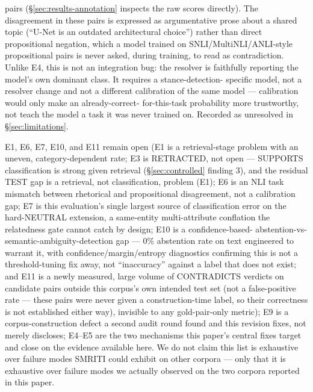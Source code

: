 \begin{itemize}
    pairs (\S\ref{sec:results-annotation} inspects the raw scores
    directly). The disagreement in these pairs is expressed as
    argumentative prose about a shared topic (``U-Net is an outdated
    architectural choice'') rather than direct propositional negation,
    which a model trained on SNLI/MultiNLI/ANLI-style propositional pairs
    is never asked, during training, to read as contradiction. Unlike E4,
    this is not an integration bug: the resolver is faithfully reporting
    the model's own dominant class. It requires a stance-detection-
    specific model, not a resolver change and not a different calibration
    of the same model --- calibration would only make an already-correct-
    for-this-task probability more trustworthy, not teach the model a
    task it was never trained on. Recorded as unresolved in
    \S\ref{sec:limitations}.
\end{itemize}

E1, E6, E7, E10, and E11 remain open (E1 is a retrieval-stage problem
with an uneven, category-dependent rate; E3 is RETRACTED, not open --- SUPPORTS
classification is strong given retrieval (\S\ref{sec:controlled} finding
3), and the residual TEST gap is a retrieval, not classification,
problem (E1); E6 is an NLI task mismatch between rhetorical
and propositional disagreement, not a calibration gap; E7 is this
evaluation's single largest source of classification error on the
hard-NEUTRAL extension, a same-entity multi-attribute conflation the
relatedness gate cannot catch by design; E10 is a confidence-based-
abstention-vs-semantic-ambiguity-detection gap --- 0\% abstention rate on
text engineered to warrant it, with confidence/margin/entropy
diagnostics confirming this is not a threshold-tuning fix away, not
``inaccuracy'' against a label that does not exist; and E11 is a newly
measured, large volume of CONTRADICTS verdicts on candidate pairs outside
this corpus's own intended test set (not a false-positive rate --- these
pairs were never given a construction-time label, so their correctness
is not established either way), invisible to any gold-pair-only
metric); E9 is a corpus-construction defect a second audit round
found and this revision fixes, not merely discloses; E4--E5 are the two
mechanisms this paper's central fixes target and close on the evidence
available here. We do not claim this
list is exhaustive over failure modes SMRITI could exhibit on other
corpora --- only that it is exhaustive over failure modes we actually
observed on the two corpora reported in this paper.
